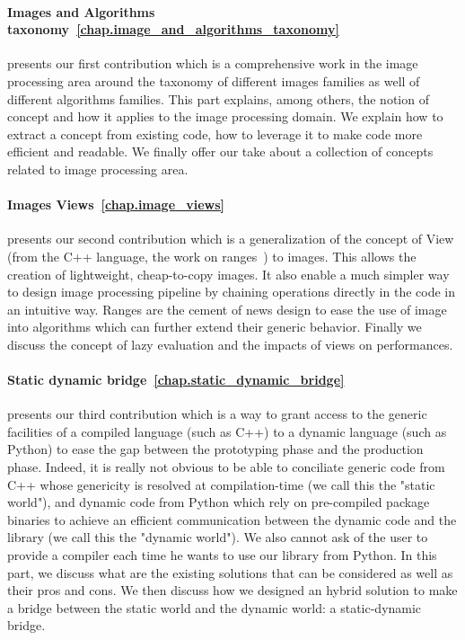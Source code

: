 \paragraph{Images and Algorithms taxonomy~\ref{chap.image_and_algorithms_taxonomy}} presents our first contribution
which is a comprehensive work in the image processing area around the taxonomy of different images families as well of
different algorithms families. This part explains, among others, the notion of concept and how it applies to the image
processing domain. We explain how to extract a concept from existing code, how to leverage it to make code more
efficient and readable. We finally offer our take about a collection of concepts related to image processing area.

\paragraph{Images Views~\ref{chap.image_views}} presents our second contribution which is a generalization of the
concept of View (from the C++ language, the work on ranges~\parencite{niebler.2018.ranges}) to images. This allows the
creation of lightweight, cheap-to-copy images. It also enable a much simpler way to design image processing pipeline by
chaining operations directly in the code in an intuitive way. Ranges are the cement of news design to ease the use of
image into algorithms which can further extend their generic behavior. Finally we discuss the concept of lazy evaluation
and the impacts of views on performances.

\paragraph{Static dynamic bridge~\ref{chap.static_dynamic_bridge}} presents our third contribution which is a way to
grant access to the generic facilities of a compiled language (such as C++) to a dynamic language (such as Python) to
ease the gap between the prototyping phase and the production phase. Indeed, it is really not obvious to be able to
conciliate generic code from C++ whose genericity is resolved at compilation-time (we call this the "static world"), and
dynamic code from Python which rely on pre-compiled package binaries to achieve an efficient communication between the
dynamic code and the library (we call this the "dynamic world"). We also cannot ask of the user to provide a compiler
each time he wants to use our library from Python. In this part, we discuss what are the existing solutions that can be
considered as well as their pros and cons. We then discuss how we designed an hybrid solution to make a bridge between
the static world and the dynamic world: a static-dynamic bridge.

